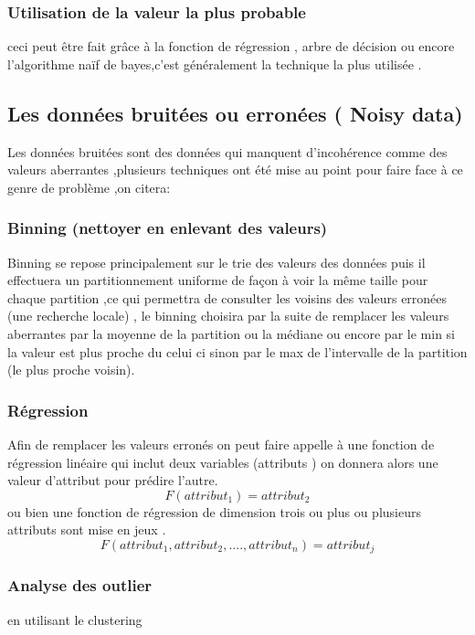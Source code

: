 \documentclass[12pt,a4paper,oneside]{book}
\begin{document}
\subsubsection{Utilisation de la valeur la plus probable}
ceci peut être fait grâce à la fonction de régression  , arbre de décision ou encore  l'algorithme naïf de bayes,c'est généralement la technique la plus utilisée  .


\subsection{Les données bruitées ou erronées ( Noisy data)}
Les données bruitées sont des données qui manquent d'incohérence comme des valeurs aberrantes ,plusieurs techniques ont été mise au point pour faire face à ce genre de problème ,on citera:
\subsubsection{Binning (nettoyer en enlevant des valeurs)}
Binning se repose principalement sur le trie des valeurs des données puis il effectuera un partitionnement uniforme  de façon à voir la même taille pour chaque partition ,ce qui permettra de consulter les voisins des valeurs erronées (une recherche locale) , le binning choisira par la suite de remplacer les valeurs aberrantes par la moyenne de la partition ou la médiane ou encore par le min si la valeur est plus proche du celui ci sinon par le max de l'intervalle de la  partition (le plus proche voisin).

\subsubsection{Régression}
Afin de remplacer les valeurs erronés on peut faire appelle à une fonction de régression linéaire 
qui inclut deux variables (attributs ) on donnera alors une valeur d'attribut pour prédire l'autre.
\begin{equation*}
	F(attribut_1)=attribut_2
\end{equation*}
ou bien une fonction de régression de dimension trois ou plus ou plusieurs attributs sont mise en jeux .
\begin{equation*}
	F(attribut_1,attribut_2,....,attribut_n)=attribut_j  \end{equation*}
\subsubsection{Analyse des outlier}
en utilisant le clustering 
\end{document}
